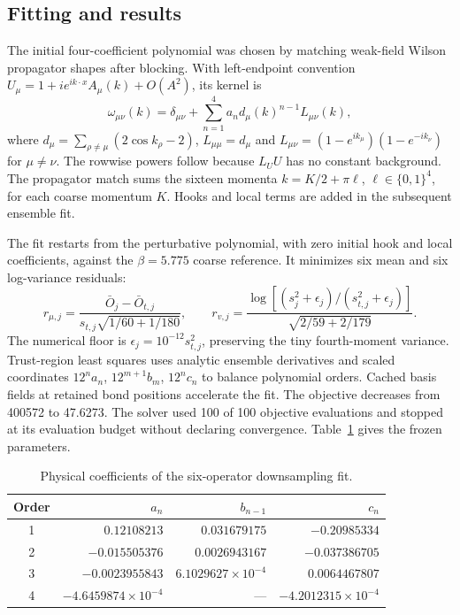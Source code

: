 \documentclass[aps,prd,superscriptaddress,nofootinbib,eqsecnum,floatfix,amsmath,longbibliography]{revtex4-2}
\begin{document}
\subsection{Fitting and results}
The initial four-coefficient polynomial was chosen by matching weak-field
Wilson propagator shapes after blocking. With left-endpoint convention
$U_\mu=1+i e^{ik\cdot x}A_\mu(k)+O(A^2)$, its kernel is
\begin{equation}
 \omega_{\mu\nu}(k)=\delta_{\mu\nu}
       +\sum_{n=1}^4a_n d_\mu(k)^{n-1}L_{\mu\nu}(k),
\end{equation}
where $d_\mu=\sum_{\rho\ne\mu}(2\cos k_\rho-2)$,
$L_{\mu\mu}=d_\mu$ and $L_{\mu\nu}=(1-e^{ik_\mu})(1-e^{-ik_\nu})$
for $\mu\ne\nu$. The rowwise powers follow because $L_UU$ has no constant
background. The propagator match sums the sixteen momenta
$k=K/2+\pi\ell$, $\ell\in\{0,1\}^4$, for each coarse momentum $K$.
Hooks and local terms are added in the subsequent ensemble fit.

The fit restarts from the perturbative polynomial, with zero initial hook
and local coefficients, against the $\beta=5.775$ coarse reference. It
minimizes six mean and six log-variance residuals:
\begin{equation}
 r_{\mu,j}=\frac{\bar O_j-\bar O_{t,j}}
 {s_{t,j}\sqrt{1/60+1/180}},\qquad
 r_{v,j}=\frac{\log[(s_j^2+\epsilon_j)/(s_{t,j}^2+\epsilon_j)]}
 {\sqrt{2/59+2/179}}.
\end{equation}
The numerical floor is $\epsilon_j=10^{-12}s_{t,j}^2$, preserving the tiny
fourth-moment variance. Trust-region least squares uses analytic ensemble derivatives and scaled
coordinates $12^na_n$, $12^{m+1}b_m$, $12^nc_n$ to balance polynomial
orders. Cached basis fields at retained bond positions accelerate the fit.
The objective decreases from 400572 to 47.6273. The solver used 100 of 100 objective evaluations and stopped at its evaluation budget without declaring convergence.
Table~\ref{tab:coefficients} gives the frozen parameters.
\begin{table}[t]
\caption{Physical coefficients of the six-operator downsampling fit.}
\label{tab:coefficients}
\begin{tabular}{crrr}\toprule
Order & $a_n$ & $b_{n-1}$ & $c_n$\\\midrule
1 & $0.12108213$ & $0.031679175$ & $-0.20985334$\\
2 & $-0.015505376$ & $0.0026943167$ & $-0.037386705$\\
3 & $-0.0023955843$ & $6.1029627\times10^{-4}$ & $0.0064467807$\\
4 & $-4.6459874\times10^{-4}$ & --- & $-4.2012315\times10^{-4}$\\
\bottomrule\end{tabular}\end{table}
\end{document}
